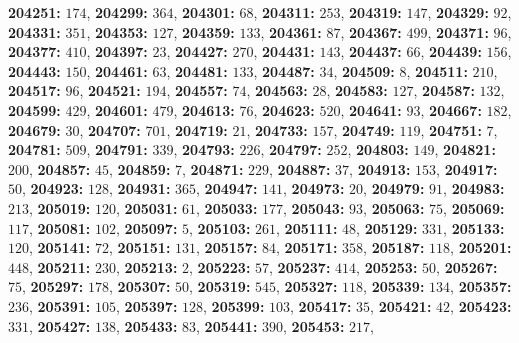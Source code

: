 \textsf{\bfseries 204251:} $174$, \textsf{\bfseries 204299:} $364$, \textsf{\bfseries 204301:} $68$, \textsf{\bfseries 204311:} $253$, \textsf{\bfseries 204319:} $147$, \textsf{\bfseries 204329:} $92$, \textsf{\bfseries 204331:} $351$, \textsf{\bfseries 204353:} $127$, \textsf{\bfseries 204359:} $133$, \textsf{\bfseries 204361:} $87$, \textsf{\bfseries 204367:} $499$, \textsf{\bfseries 204371:} $96$, \textsf{\bfseries 204377:} $410$, \textsf{\bfseries 204397:} $23$, \textsf{\bfseries 204427:} $270$, \textsf{\bfseries 204431:} $143$, \textsf{\bfseries 204437:} $66$, \textsf{\bfseries 204439:} $156$, \textsf{\bfseries 204443:} $150$, \textsf{\bfseries 204461:} $63$, \textsf{\bfseries 204481:} $133$, \textsf{\bfseries 204487:} $34$, \textsf{\bfseries 204509:} $8$, \textsf{\bfseries 204511:} $210$, \textsf{\bfseries 204517:} $96$, \textsf{\bfseries 204521:} $194$, \textsf{\bfseries 204557:} $74$, \textsf{\bfseries 204563:} $28$, \textsf{\bfseries 204583:} $127$, \textsf{\bfseries 204587:} $132$, \textsf{\bfseries 204599:} $429$, \textsf{\bfseries 204601:} $479$, \textsf{\bfseries 204613:} $76$, \textsf{\bfseries 204623:} $520$, \textsf{\bfseries 204641:} $93$, \textsf{\bfseries 204667:} $182$, \textsf{\bfseries 204679:} $30$, \textsf{\bfseries 204707:} $701$, \textsf{\bfseries 204719:} $21$, \textsf{\bfseries 204733:} $157$, \textsf{\bfseries 204749:} $119$, \textsf{\bfseries 204751:} $7$, \textsf{\bfseries 204781:} $509$, \textsf{\bfseries 204791:} $339$, \textsf{\bfseries 204793:} $226$, \textsf{\bfseries 204797:} $252$, \textsf{\bfseries 204803:} $149$, \textsf{\bfseries 204821:} $200$, \textsf{\bfseries 204857:} $45$, \textsf{\bfseries 204859:} $7$, \textsf{\bfseries 204871:} $229$, \textsf{\bfseries 204887:} $37$, \textsf{\bfseries 204913:} $153$, \textsf{\bfseries 204917:} $50$, \textsf{\bfseries 204923:} $128$, \textsf{\bfseries 204931:} $365$, \textsf{\bfseries 204947:} $141$, \textsf{\bfseries 204973:} $20$, \textsf{\bfseries 204979:} $91$, \textsf{\bfseries 204983:} $213$, \textsf{\bfseries 205019:} $120$, \textsf{\bfseries 205031:} $61$, \textsf{\bfseries 205033:} $177$, \textsf{\bfseries 205043:} $93$, \textsf{\bfseries 205063:} $75$, \textsf{\bfseries 205069:} $117$, \textsf{\bfseries 205081:} $102$, \textsf{\bfseries 205097:} $5$, \textsf{\bfseries 205103:} $261$, \textsf{\bfseries 205111:} $48$, \textsf{\bfseries 205129:} $331$, \textsf{\bfseries 205133:} $120$, \textsf{\bfseries 205141:} $72$, \textsf{\bfseries 205151:} $131$, \textsf{\bfseries 205157:} $84$, \textsf{\bfseries 205171:} $358$, \textsf{\bfseries 205187:} $118$, \textsf{\bfseries 205201:} $448$, \textsf{\bfseries 205211:} $230$, \textsf{\bfseries 205213:} $2$, \textsf{\bfseries 205223:} $57$, \textsf{\bfseries 205237:} $414$, \textsf{\bfseries 205253:} $50$, \textsf{\bfseries 205267:} $75$, \textsf{\bfseries 205297:} $178$, \textsf{\bfseries 205307:} $50$, \textsf{\bfseries 205319:} $545$, \textsf{\bfseries 205327:} $118$, \textsf{\bfseries 205339:} $134$, \textsf{\bfseries 205357:} $236$, \textsf{\bfseries 205391:} $105$, \textsf{\bfseries 205397:} $128$, \textsf{\bfseries 205399:} $103$, \textsf{\bfseries 205417:} $35$, \textsf{\bfseries 205421:} $42$, \textsf{\bfseries 205423:} $331$, \textsf{\bfseries 205427:} $138$, \textsf{\bfseries 205433:} $83$, \textsf{\bfseries 205441:} $390$, \textsf{\bfseries 205453:} $217$, 
